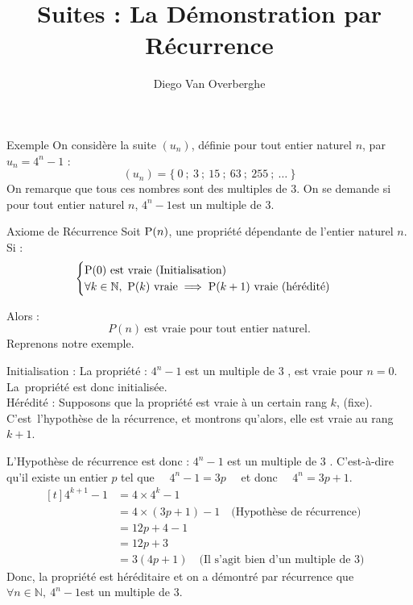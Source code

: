 \documentclass{cours}
\title{Suites : La Démonstration par Récurrence}
\author{Diego Van Overberghe}
\begin{document}

    \begin{Gpartie}{Exemple}
        On considère la suite $\left(u_n\right)$, définie pour tout entier naturel $n$, par\quad$u_n=4^n-1$ :
            \[\left(u_n\right)=\big\{~0~;~3~;~15~;~63~;~255~;~\dotso~\big\}\]
        On remarque que tous ces nombres sont des multiples de 3. On se demande si pour tout entier naturel $n$, \quad$4^n-1$\quad est un multiple de 3.
    \end{Gpartie}
    \begin{Gpartie}{Axiome de Récurrence}
        Soit $\mathrm{P}(n)$, une propriété dépendante de l'entier naturel $n$.\\
        Si :
        \[\begin{cases}
            \mathrm{P}(0)\text{ est vraie (Initialisation)} \\ \forall k\in\mathbb{N},~\mathrm{P}(k)\text{ vraie}\implies\mathrm{P}(k+1)\text{ vraie (hérédité)}
        \end{cases}\]

        Alors : \[P(n)~\text{est vraie pour tout entier naturel.}\]
        Reprenons notre exemple. 
        
        Initialisation : La propriété : \og $4^n-1$ est un multiple de 3 \fg{}, est vraie pour $n=0$. La~propriété est donc initialisée. \\ 
        Hérédité : Supposons que la propriété est vraie à un certain rang $k$, (fixe). C'est~l'hypothèse de la récurrence, et montrons qu'alors, elle est vraie au rang $k+1$.
        
        L'Hypothèse de récurrence est donc : \og $4^n-1$ est un multiple de 3 \fg{}. C'est-à-dire qu'il existe un entier $p$ tel que $\quad4^n-1=3p\quad$ et donc $\quad4^n=3p+1$.
        \vspace*{-1ex}\[\begin{aligned}[t]
            4^{k+1}-1&=4\times 4^k-1 &\\
            &= 4\times\left(3p+1\right)-1 \quad \text{(Hypothèse de récurrence)} &\\
            &=12p+4-1 &\\
            &=12p+3 &\\
            &=3\left(4p+1\right) \quad \text{(Il s'agit bien d'un multiple de 3)}
        \end{aligned}\]
        Donc, la propriété est héréditaire et on a démontré par récurrence que \quad$\forall n\in\mathbb{N},~4^n-1$\quad est un multiple de 3.
    \end{Gpartie}
\end{document}
